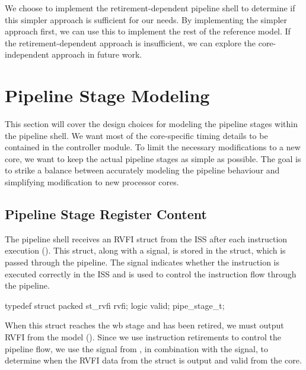We choose to implement the retirement-dependent pipeline shell to determine if this simpler approach is sufficient for our needs. By implementing the simpler approach first, we can use this to implement the rest of the reference model. If the retirement-dependent approach is insufficient, we can explore the core-independent approach in future work.




\section{Pipeline Stage Modeling }%

This section will cover the design choices for modeling the pipeline stages within the pipeline shell. 
We want most of the core-specific timing details to be contained in the controller module. To limit the necessary modifications to a new core, we want to keep the actual pipeline stages as simple as possible. 
The goal is to strike a balance between accurately modeling the pipeline behaviour and simplifying modification to new processor cores.

\subsection{Pipeline Stage Register Content}

The pipeline shell receives an RVFI struct from the ISS after each instruction execution (). This  struct, along with a  signal, is stored in the  struct, which is passed through the pipeline. The  signal indicates whether the instruction is executed correctly in the ISS and is used to control the instruction flow through the pipeline.

\begin{systemverilog}
typedef struct packed {
    st_rvfi rvfi;
    logic valid;
} pipe_stage_t; 
\end{systemverilog}

When this struct reaches the \acrshort{wb} stage and has been retired, we must output RVFI from the model (). Since we use instruction retirements to control the pipeline flow, we use the  signal from , in combination with the  signal, to determine when the RVFI data from the struct is output and valid from the core.

